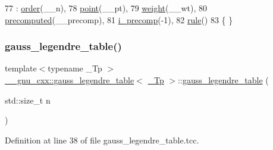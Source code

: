 \begin{DoxyCode}
77       : \hyperlink{struct____gnu__cxx_1_1gauss__legendre__table_aecdc9cdb90f5a7b4f06a455cd868370f}{order}(\_\_n),
78         \hyperlink{struct____gnu__cxx_1_1gauss__legendre__table_a2b2ec503ecb0fa74ccdba5b81e4edcd0}{point}(\_\_pt),
79         \hyperlink{struct____gnu__cxx_1_1gauss__legendre__table_a4bc3bb73288637899d2eb459eb751607}{weight}(\_\_wt),
80         \hyperlink{struct____gnu__cxx_1_1gauss__legendre__table_acbcd2eeb79842a232207882c5a4d01c0}{precomputed}(\_\_precomp),
81         \hyperlink{struct____gnu__cxx_1_1gauss__legendre__table_a6f86bbb7d5ed663b88683156a38f4a05}{i\_precomp}(-1),
82         \hyperlink{struct____gnu__cxx_1_1gauss__legendre__table_a1c1f6c907f2bcee143c39136679901b4}{rule}()
83       \{ \}
\end{DoxyCode}
\mbox{\label{struct____gnu__cxx_1_1gauss__legendre__table_a135f6261d6822974a4fe104dadffdac3}} 
\subsubsection{\texorpdfstring{gauss\+\_\+legendre\+\_\+table()}{gauss\_legendre\_table()}\hspace{0.1cm}{\footnotesize\ttfamily [2/2]}}
{\footnotesize\ttfamily template$<$typename \+\_\+\+Tp $>$ \\
\hyperlink{struct____gnu__cxx_1_1gauss__legendre__table}{\+\_\+\+\_\+gnu\+\_\+cxx\+::gauss\+\_\+legendre\+\_\+table}$<$ \hyperlink{namespace____gnu__cxx_a3b19a9c800ca194374ef9172290f7d79}{\+\_\+\+Tp} $>$\+::\hyperlink{struct____gnu__cxx_1_1gauss__legendre__table}{gauss\+\_\+legendre\+\_\+table} (\begin{DoxyParamCaption}\item[{std\+::size\+\_\+t}]{n }\end{DoxyParamCaption})\hspace{0.3cm}{\ttfamily [explicit]}}



Definition at line 38 of file gauss\+\_\+legendre\+\_\+table.\+tcc.



